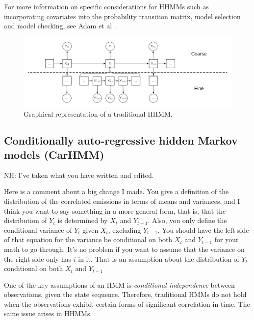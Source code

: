 For more information on specific considerations for HHMMs such as incorporating covariates into the probability transition matrix, model selection and model checking, see Adam et al \cite{Adam:2019}.

\begin{figure}[h!]
	\centering
	\includegraphics[width=6.5in]{../Plots/HHMM.png}
	\caption{Graphical representation of a traditional HHMM.}
	\label{fig:HHMM}
\end{figure}

\subsection{Conditionally auto-regressive hidden Markov models (CarHMM)}

{\bf{NH: 
I've taken what you have written and edited. 

Here is a comment about a big change I made.  You give a definition of the distribution of the correlated emissions in terms of means and variances, and I think you want to say something in a more general form, that is, that the distribution of $Y_t$ is determined by $X_t$ and $Y_{t-1}$.  Also,  you only define the conditional variance of $Y_t$ given $X_t$,  excluding $Y_{t-1}$.  You should have the left side of that equation for the variance be conditional on both $X_t$ and $Y_{t-1}$ for your math to go through.  It's no problem if you want to assume that the variance on the right side only has $i$ in it.  That is an assumption about the distribution of $Y_t$  conditional on both $X_t$ and $Y_{t-1}$ 
}}


One of the key assumptions of an HMM is \textit{conditional independence} between observations, given the state sequence.  Therefore, traditional HMMs do not hold when the observations exhibit certain forms of significant correlation in time.  The same issue arises in HHMMs. 

